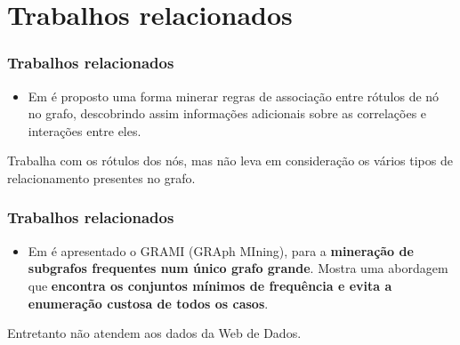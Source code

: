 \documentclass[hyperref={pdfpagelabels=false}]{beamer}
\begin{document}
\section {Trabalhos relacionados}

\begin{frame}
	\frametitle{Trabalhos relacionados}
\begin{itemize}
      \item {Em \cite{Hendrickx2015} é proposto uma forma minerar regras de associação entre rótulos de nó no grafo, descobrindo assim informações adicionais sobre as correlações e interações entre eles. %
      }

	\end{itemize}
    Trabalha com os rótulos dos nós, mas não leva em consideração os vários tipos de relacionamento presentes no grafo.
\end{frame}

\begin{frame}
	\frametitle{Trabalhos relacionados}
\begin{itemize}
	\item Em \cite{Elseidy2014} é apresentado o GRAMI (GRAph MIning), para a \textbf{mineração de subgrafos frequentes num único grafo grande}. Mostra uma abordagem que \textbf{encontra os conjuntos mínimos de frequência e evita a enumeração custosa de todos os casos}.
	\end{itemize}	
	Entretanto não atendem aos dados da Web de Dados.
\end{frame}


\end{document}
